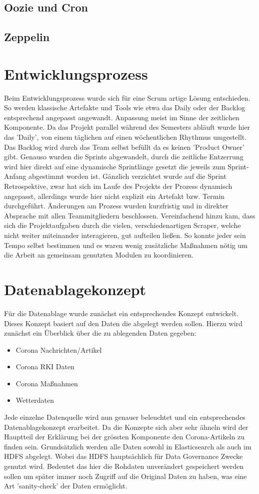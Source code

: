 \documentclass[12pt,oneside,a4paper,parskip]{scrbook}
\begin{document}
\section{Oozie und Cron}
\section{Zeppelin}

\chapter{Entwicklungsprozess}
Beim Entwicklungsprozess wurde sich f\"ur eine Scrum artige L\"osung entschieden. So werden klassische Artefakte und Tools wie etwa das Daily oder der Backlog entsprechend angepasst angewandt. Anpassung meist im Sinne der zeitlichen Komponente. Da das Projekt parallel w\"ahrend des Semesters abl\"auft wurde hier das 'Daily', von einem t\"aglichen auf einen w\"ochentlichen Rhythmus umgestellt. Das Backlog wird durch das Team selbst bef\"ullt da es keinen 'Product Owner' gibt. Genauso wurden die Sprints abgewandelt, durch die zeitliche Entzerrung wird hier direkt auf eine dynamische Sprintl\"ange gesetzt die jeweils zum Sprint-Anfang abgestimmt worden ist. \newline
G\"anzlich verzichtet wurde auf die Sprint Retrospektive, zwar hat sich im Laufe des Projekts der Prozess dynamisch angepasst, allerdings wurde hier nicht explizit ein Artefakt bzw. Termin durchgef\"uhrt. \"Anderungen am Prozess wurden kurzfristig und in direkter Absprache mit allen Teammitgliedern beschlossen. Vereinfachend hinzu kam, dass sich die Projektaufgaben durch die vielen, verschiedenartigen Scraper, welche nicht weiter miteinander interagieren, gut aufteilen ließen. So konnte jeder sein Tempo selbst bestimmen und es waren wenig zusätzliche Maßnahmen nötig um die Arbeit an gemeinsam genutzten Modulen zu koordinieren.


\chapter{Datenablagekonzept}
F\"ur die Datenablage wurde zun\"achst ein entsprechendes Konzept entwickelt. Dieses Konzept basiert auf den Daten die abgelegt werden sollen. Hierzu wird zun\"achst ein \"Uberblick \"uber die zu ablegenden Daten gegeben:
\begin{itemize}
	\item Corona Nachrichten/Artikel
	\item Corona RKI Daten
	\item Corona Maßnahmen
	\item Wetterdaten
\end{itemize}
Jede einzelne Datenquelle wird nun genauer beleuchtet und ein entsprechendes Datenablagekonzept erarbeitet. Da die Konzepte sich aber sehr \"ahneln wird der Hauptteil der Erkl\"arung bei der gr\"ossten Komponente den Corona-Artikeln zu finden sein. Grunds\"atzlich werden alle Daten sowohl in Elasticsearch als auch im HDFS abgelegt. Wobei das HDFS haupts\"achlich f\"ur Data Governance Zwecke genutzt wird. Bedeutet das hier die Rohdaten unver\"andert gespeichert werden sollen um sp\"ater immer noch Zugriff auf die Original Daten zu haben, was eine Art 'sanity-check' der Daten erm\"oglicht.
\end{document}
